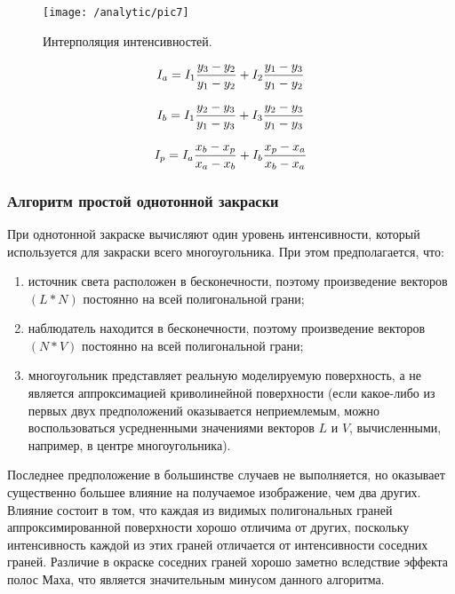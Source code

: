 \begin{figure}[H]
\center
\texttt{[image: /analytic/pic7]}
\caption{Интерполяция интенсивностей.}
\end{figure}

\begin{equation}
    I_{a} = I_{1}\frac{y_{3} - y_{2}}{y_{1} - y_{2}} + I_{2}\frac{y_{1} - y_{3}}{y_{1} - y_{2}} \notag 
\end{equation}

\begin{equation}
    I_{b} = I_{1}\frac{y_{2} - y_{3}}{y_{1} - y_{3}} + I_{3}\frac{y_{2} - y_{3}}{y_{1} - y_{3}} \notag
\end{equation}

\begin{equation}
    I_{p} = I_{a}\frac{x_{b} - x_{p}}{x_{a} - x_{b}} + I_{b}\frac{x_{p} - x_{a}}{x_{b} - x_{a}} \notag
\end{equation}

\subsubsection{Алгоритм простой однотонной закраски}\label{subsec:analytic1.2.2}

При однотонной закраске вычисляют один уровень интенсивности, который используется для закраски всего многоугольника. При этом предполагается, что:

\begin{enumerate}
	\item источник света расположен в бесконечности, поэтому произведение векторов $(L * N)$ постоянно на всей полигональной грани;
	\item наблюдатель находится в бесконечности, поэтому произведение векторов $(N * V)$ постоянно на всей полигональной грани;
	\item многоугольник представляет реальную моделируемую поверхность, а не является аппроксимацией криволинейной поверхности (если какое-либо из первых двух предположений оказывается неприемлемым, можно воспользоваться усредненными значениями векторов $L$ и $V$, вычисленными, например, в центре многоугольника).
\end{enumerate}

Последнее предположение в большинстве случаев не выполняется, но оказывает существенно большее влияние на получаемое изображение, чем два других. Влияние состоит в том, что каждая из видимых полигональных граней аппроксимированной поверхности хорошо отличима от других, поскольку интенсивность каждой из этих граней отличается от интенсивности соседних граней. Различие в окраске соседних граней хорошо заметно вследствие эффекта полос Маха, что является значительным минусом данного алгоритма.

